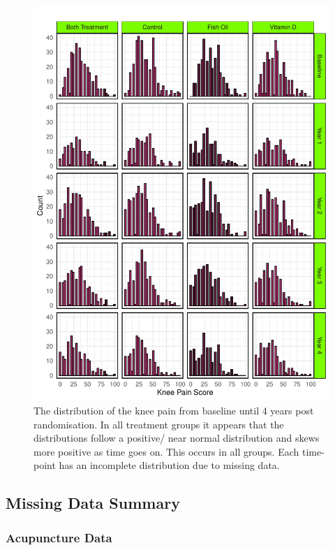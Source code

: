 \documentclass{article}
\newcommand{\pandocbounded}[1]{#1}
\begin{document}
\begin{figure}
\centering
\pandocbounded{\includegraphics[keepaspectratio]{Final_Report_files/figure-latex/unnamed-chunk-17-1.pdf}}
\caption{The distribution of the knee pain from baseline until 4 years
post randomisation. In all treatment groups it appears that the
distributions follow a positive/ near normal distribution and skews more
positive as time goes on. This occurs in all groups. Each time-point has
an incomplete distribution due to missing data.}
\end{figure}

\newpage

\subsection{Missing Data Summary}\label{missing-data-summary}

\subsubsection{Acupuncture Data}\label{acupuncture-data-1}
\end{document}
